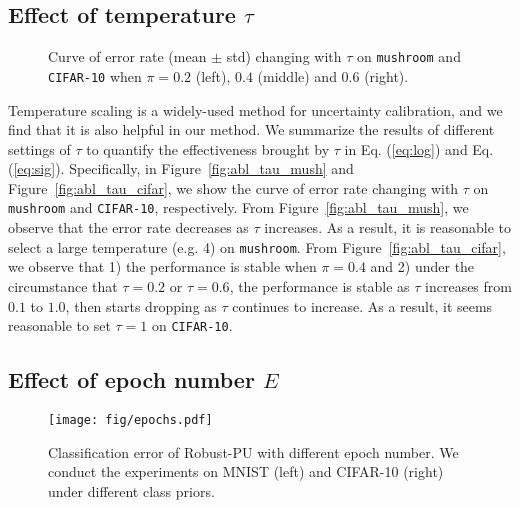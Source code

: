\documentclass[sigconf]{acmart}
\newcommand{\ourmethod}{Robust-PU\xspace}
\begin{document}
\subsection{Effect of temperature $\tau$}

\begin{figure}[htbp]
    \centering
    \quad
    \caption{Curve of error rate (mean $\pm$ std) changing with $\tau$ on \texttt{mushroom} and \texttt{CIFAR-10} when $\pi=0.2$ (left), $0.4$ (middle) and $0.6$ (right).}
\end{figure}

Temperature scaling is a widely-used method for uncertainty calibration, and we find that it is also helpful in our method. We summarize the results of different settings of $\tau$ to quantify the effectiveness brought by $\tau$ in Eq. (\ref{eq:log}) and Eq. (\ref{eq:sig}). Specifically, in Figure~\ref{fig:abl_tau_mush} and Figure~\ref{fig:abl_tau_cifar}, we show the curve of error rate changing with $\tau$ on \texttt{mushroom} and \texttt{CIFAR-10}, respectively. From Figure~\ref{fig:abl_tau_mush}, we observe that the error rate decreases as $\tau$ increases. As a result, it is reasonable to select a large temperature (e.g. 4) on \texttt{mushroom}. From Figure~\ref{fig:abl_tau_cifar}, we observe that 1) the performance is stable when $\pi=0.4$ and 2) under the circumstance that  $\tau=0.2$ or $\tau=0.6$, the performance is stable as $\tau$ increases from $0.1$ to $1.0$, then starts dropping as $\tau$ continues to increase. As a result, it seems reasonable to set $\tau=1$ on \texttt{CIFAR-10}.

\subsection{Effect of epoch number $E$}

\begin{figure}[htbp]
    \centering
    \texttt{[image: fig/epochs.pdf]}
    \caption{Classification error of \ourmethod with different epoch number. We conduct the experiments on MNIST (left) and CIFAR-10 (right) under different class priors.}
    \label{fig:epochs}
\end{figure}
\end{document}
